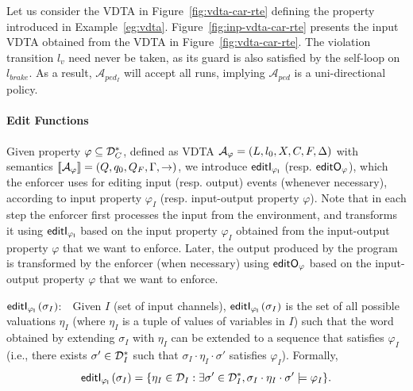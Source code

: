 \begin{example}
Let us consider the \ac{VDTA} in Figure~\ref{fig:vdta-car-rte} defining the property introduced in Example~\ref{eg:vdta}.
Figure~\ref{fig:inp-vdta-car-rte} presents the input \ac{VDTA} obtained from the \ac{VDTA} in Figure~\ref{fig:vdta-car-rte}.
The violation transition $l_v$ need never be taken, as its guard is also satisfied by the self-loop on $l_{brake}$. 
As a result, $\mathcal{A}_{ped_I}$ will accept all runs, implying $\mathcal{A}_{ped}$ is a uni-directional policy.
\end{example}
\paragraph{Edit Functions}
Given property $\varphi\subseteq {\mathcal D}_C^*$, defined as \ac{VDTA} ${\mathcal A}_{\varphi}=\left(L, {l_0}, X, C,  F,  \Delta \right)$ with semantics $[\!\left[{\mathcal A}_\varphi\right]\!]=\left( Q, q_0, Q_F, \Gamma, \to \right)$,
we introduce $\mathsf{editI_{\varphi_I}}$ (resp. $\mathsf{editO_{\varphi}}$), which the enforcer uses for editing input (resp. output) events (whenever necessary), according to input property $\varphi_I$ (resp. input-output property $\varphi$).
Note that in each step the enforcer first processes the input from the environment, and transforms it using $\mathsf{editI_{\varphi_I}}$ based on the input property $\varphi_I$ obtained from the input-output property $\varphi$ that we want to enforce.
Later, the output produced by the program is transformed by the enforcer (when necessary) using $\mathsf{editO_{\varphi}}$ based on the input-output property $\varphi$ that we want to enforce.
%
\squishlist
\item {{\boldmath$\mathsf{editI_{\varphi_I}}\left(\sigma_I\right)$}}:~~Given $I$ (set of input channels), $\mathsf{editI_{\varphi_I}}\left(\sigma_I\right)$ is the set of all possible valuations $\eta_I$ (where $\eta_I$ is a tuple of values of variables in $I$) such that the word obtained by extending $\sigma_I$ with $\eta_I$ can be extended to a sequence that satisfies $\varphi_I$ (i.e., there exists $\sigma'\in {\mathcal D}_I^*$ such that $\sigma_I\cdot \eta_I \cdot \sigma'$ satisfies $\varphi_I$).
Formally,\\
\[\mathsf{editI_{\varphi_I}}\left(\sigma_I \right) = \{ \eta_I \in {\mathcal D}_I: \exists \sigma'\in {\mathcal D}_I^*, \sigma_I \cdot \eta_I \cdot \sigma' \models \varphi_I \}.\]

